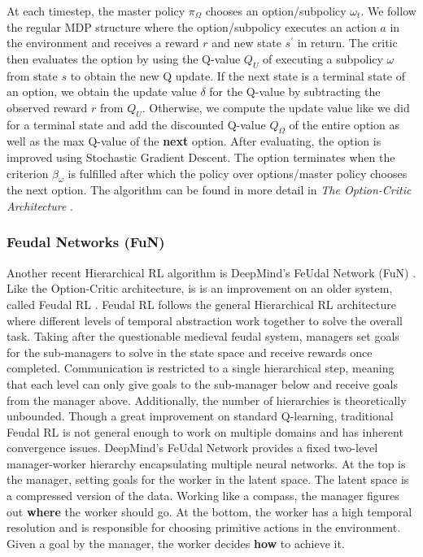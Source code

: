 \documentclass[notitlepage,a4paper,11pt]{article}
\begin{document}
At each timestep, the master policy $\pi_\Omega$ chooses an option/subpolicy $\omega_t$. We follow the regular MDP structure where the option/subpolicy executes an action $a$ in the environment and receives a reward $r$ and new state $s^\prime$ in return. The critic then evaluates the option by using the Q-value $Q_U$ of executing a subpolicy $\omega$ from state $s$ to obtain the new Q update. If the next state is a terminal state of an option, we obtain the update value $\delta$ for the Q-value by subtracting the observed reward $r$ from $Q_U$. Otherwise, we compute the update value like we did for a terminal state and add the discounted Q-value $Q_\Omega$ of the entire option as well as the max Q-value of the \textbf{next} option. After evaluating, the option is improved using Stochastic Gradient Descent. The option terminates when the criterion $\beta_\omega$ is fulfilled after which the policy over options/master policy chooses the next option. The algorithm can be found in more detail in \textit{The Option-Critic Architecture} \cite{bacon2017option}.

\subsubsection{Feudal Networks (FuN)}
Another recent Hierarchical RL algorithm is DeepMind's FeUdal Network (FuN) \cite{vezhnevets2017feudal}. Like the Option-Critic architecture, is is an improvement on an older system, called Feudal RL \cite{dayan1993feudal}. Feudal RL follows the general Hierarchical RL architecture where different levels of temporal abstraction work together to solve the overall task. Taking after the questionable medieval feudal system, managers set goals for the sub-managers to solve in the state space and receive rewards once completed. Communication is restricted to a single hierarchical step, meaning that each level can only give goals to the sub-manager below and receive goals from the manager above. Additionally, the number of hierarchies is theoretically unbounded. Though a great improvement on standard Q-learning, traditional Feudal RL is not general enough to work on multiple domains and has inherent convergence issues. DeepMind's FeUdal Network provides a fixed two-level manager-worker hierarchy encapsulating multiple neural networks. At the top is the manager, setting goals for the worker in the latent space. The latent space is a compressed version of the data. Working like a compass, the manager figures out \textbf{where} the worker should go. At the bottom, the worker has a high temporal resolution and is responsible for choosing primitive actions in the environment. Given a goal by the manager, the worker decides \textbf{how} to achieve it.
\end{document}
